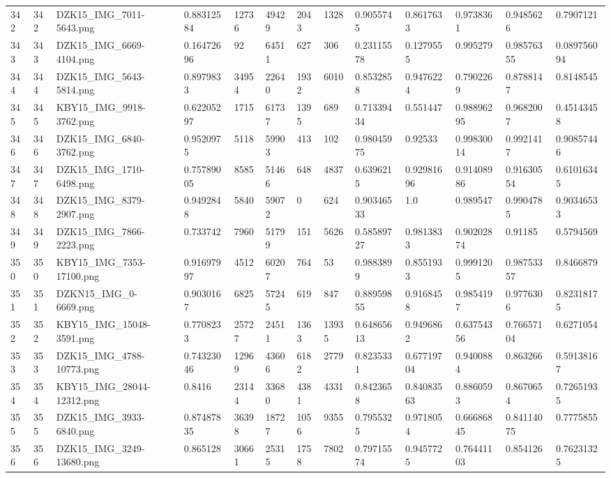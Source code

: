 \documentclass[11pt, a4paper, twoside]{report}
\begin{document}
\begin{longtable}[c]{@{}lllllllllllll@{}}
342 & 342 & DZK15\_IMG\_7011-5643.png & 0.88312584 & 12736 & 49429 & 2043 & 1328 & 0.9055745 & 0.8617633 & 0.9738361 & 0.9485626 & 0.7907121 \\
343 & 343 & DZK15\_IMG\_6669-4104.png & 0.16472696 & 92 & 64511 & 627 & 306 & 0.23115578 & 0.1279555 & 0.995279 & 0.98576355 & 0.089756094 \\
344 & 344 & DZK15\_IMG\_5643-5814.png & 0.8979833 & 34954 & 22640 & 1932 & 6010 & 0.8532858 & 0.9476224 & 0.7902269 & 0.8788147 & 0.8148545 \\
345 & 345 & KBY15\_IMG\_9918-3762.png & 0.62205297 & 1715 & 61737 & 1395 & 689 & 0.71339434 & 0.551447 & 0.98896295 & 0.9682007 & 0.45143458 \\
346 & 346 & DZK15\_IMG\_6840-3762.png & 0.9520975 & 5118 & 59903 & 413 & 102 & 0.98045975 & 0.92533 & 0.99830014 & 0.9921417 & 0.90857446 \\
347 & 347 & DZK15\_IMG\_1710-6498.png & 0.75789005 & 8585 & 51466 & 648 & 4837 & 0.6396215 & 0.92981696 & 0.91408986 & 0.91630554 & 0.61016345 \\
348 & 348 & DZK15\_IMG\_8379-2907.png & 0.9492848 & 5840 & 59072 & 0 & 624 & 0.90346533 & 1.0 & 0.989547 & 0.9904785 & 0.90346533 \\
349 & 349 & DZK15\_IMG\_7866-2223.png & 0.733742 & 7960 & 51799 & 151 & 5626 & 0.58589727 & 0.9813833 & 0.90202874 & 0.91185 & 0.5794569 \\
350 & 350 & KBY15\_IMG\_7353-17100.png & 0.91697997 & 4512 & 60207 & 764 & 53 & 0.9883899 & 0.8551933 & 0.9991205 & 0.98753357 & 0.8466879 \\
351 & 351 & DZKN15\_IMG\_0-6669.png & 0.9030167 & 6825 & 57245 & 619 & 847 & 0.88959855 & 0.9168458 & 0.9854197 & 0.9776306 & 0.82318175 \\
352 & 352 & KBY15\_IMG\_15048-3591.png & 0.7708233 & 25727 & 24511 & 1363 & 13935 & 0.64865613 & 0.9496862 & 0.63754356 & 0.76657104 & 0.6271054 \\
353 & 353 & DZK15\_IMG\_4788-10773.png & 0.74323046 & 12969 & 43606 & 6182 & 2779 & 0.8235331 & 0.67719704 & 0.9400884 & 0.863266 & 0.59138167 \\
354 & 354 & KBY15\_IMG\_28044-12312.png & 0.8416 & 23144 & 33680 & 4381 & 4331 & 0.8423658 & 0.84083563 & 0.8860593 & 0.8670654 & 0.72651935 \\
355 & 355 & DZK15\_IMG\_3933-6840.png & 0.87487835 & 36398 & 18727 & 1056 & 9355 & 0.7955325 & 0.9718054 & 0.66686845 & 0.84114075 & 0.7775855 \\
356 & 356 & DZK15\_IMG\_3249-13680.png & 0.865128 & 30661 & 25315 & 1758 & 7802 & 0.79715574 & 0.9457725 & 0.76441103 & 0.854126 & 0.76231325 \\

\end{longtable}
\end{document}
